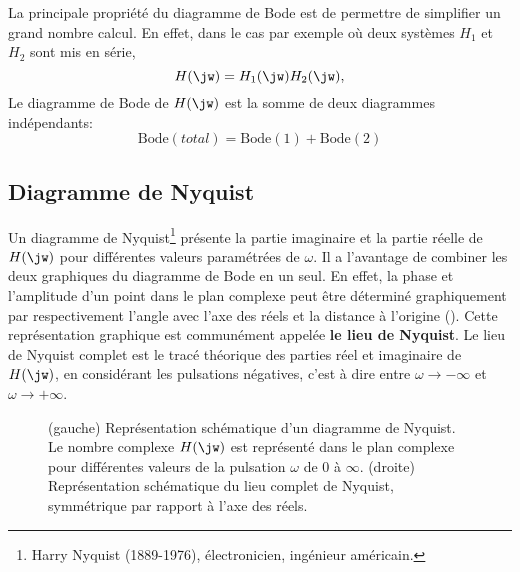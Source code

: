 La principale propriété du diagramme de Bode est de permettre de 
simplifier un grand nombre calcul. En effet, dans le cas par exemple où 
deux systèmes $H_1$ et $H_2$ sont mis en série,
$$
H(\jw)=H_1(\jw)H_2(\jw),
$$
Le diagramme de Bode de $H(\jw)$ est la somme de deux diagrammes indépendants:
$$
\mathrm{Bode}(total)=\mathrm{Bode}(1)+\mathrm{Bode}(2)
$$
\subsection{Diagramme de Nyquist}


Un diagramme de Nyquist\footnote{Harry 
Nyquist (1889-1976), électronicien, ingénieur américain.} 
présente la partie imaginaire et la partie réelle de $H(\jw)$ pour différentes 
valeurs paramétrées de $\omega$. Il a l'avantage de combiner les deux 
graphiques du diagramme de Bode en un seul. En effet, la phase et l'amplitude 
d'un point dans le plan complexe peut être déterminé graphiquement par 
respectivement l'angle avec l'axe des réels et la distance à l'origine 
(). Cette représentation graphique est communément appelée 
\textbf{le lieu de Nyquist}. Le lieu de Nyquist complet est le tracé théorique 
des parties réel et imaginaire de $H(\jw)$, en considérant les pulsations 
négatives, c'est à dire entre $\omega\rightarrow-\infty$ et 
$\omega\rightarrow+\infty$. 

\begin{figure}[!h]
    \centering
    
    \hspace{0cm}
    
    \caption{(gauche) Représentation schématique d'un diagramme de Nyquist. 
             Le nombre complexe $H(\jw)$ est représenté dans le plan 
             complexe pour différentes valeurs de la pulsation $\omega$ de 
             0 à $\infty$. (droite) Représentation schématique du lieu 
             complet de Nyquist, symmétrique par rapport à l'axe des réels.
             \label{fig-sche_nyquist}}
\end{figure}


